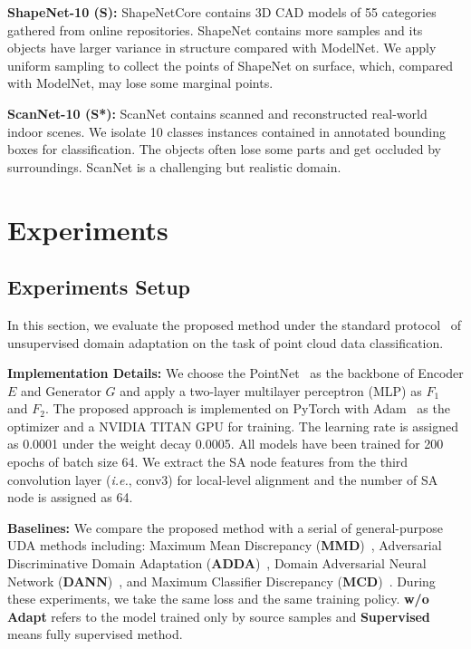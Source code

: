 \documentclass{article}
\newcommand*\ie{\textit{i.e.}}
\begin{document}
\textbf{ShapeNet-10 (S):} ShapeNetCore contains 3D CAD models of 55 categories gathered from online repositories. ShapeNet contains more samples and its objects have larger variance in structure compared with ModelNet. We apply uniform sampling to collect the points of ShapeNet on surface, which, compared with ModelNet, may lose some marginal points.

\textbf{ScanNet-10 (S*):} ScanNet contains scanned and reconstructed real-world indoor scenes. We isolate 10 classes instances contained in annotated bounding boxes for classification. The objects often lose some parts and get occluded by surroundings. ScanNet is a challenging but realistic domain.






\section{Experiments}

\subsection{Experiments Setup}

In this section, we evaluate the proposed method under the standard protocol~\cite{gong2013connecting} of unsupervised domain adaptation on the task of point cloud data classification.

\textbf{Implementation Details: }We choose the PointNet~\cite{qi2017pointnet} as the backbone of Encoder $E$ and Generator $G$ and apply a two-layer multilayer perceptron (MLP) as $F_1$ and $F_2$. The proposed approach is implemented on PyTorch with Adam~\cite{kingma2014adam} as the optimizer and a NVIDIA TITAN GPU for training. The learning rate is assigned as 0.0001 under the weight decay 0.0005. All models have been trained for 200 epochs of batch size 64. We extract the SA node features from the third convolution layer (\ie, conv3) for local-level alignment and the number of SA node is assigned as 64. 

\textbf{Baselines:} We compare the proposed method with a serial of general-purpose UDA methods including: Maximum Mean Discrepancy (\textbf{MMD})~\cite{long2013transfer}, Adversarial Discriminative Domain Adaptation (\textbf{ADDA})~\cite{tzeng2017adversarial}, Domain Adversarial Neural Network (\textbf{DANN})~\cite{ganin2014unsupervised}, and Maximum Classifier Discrepancy (\textbf{MCD})~\cite{saito2018maximum}. During these experiments, we take the same loss and the same training policy. \textbf{w/o Adapt} refers to the model trained only by source samples and \textbf{Supervised} means fully supervised method.
\end{document}
